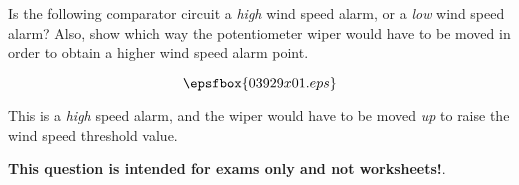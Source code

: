 

Is the following comparator circuit a {\it high} wind speed alarm, or a {\it low} wind speed alarm?  Also, show which way the potentiometer wiper would have to be moved in order to obtain a higher wind speed alarm point.

$$\epsfbox{03929x01.eps}$$







This is a {\it high} speed alarm, and the wiper would have to be moved {\it up} to raise the wind speed threshold value.







{\bf This question is intended for exams only and not worksheets!}.




